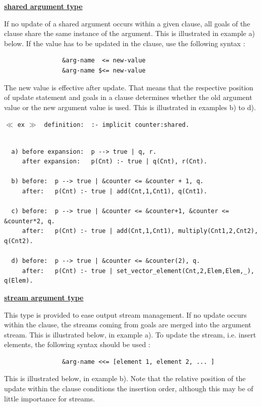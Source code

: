 \noindent\underline{\bf shared argument type}
 \vspace{1ex}\par
If no update of a shared argument occurs within a given clause, all goals
of the clause share the same instance of the argument. This is illustrated in
example a) below. If the value has to be updated in the clause, use the
following syntax :
\begin{verbatim}
                &arg-name  <= new-value
                &arg-name $<= new-value
\end{verbatim} \index{\verb|<=|} \index{\verb|$<=|}
The new value is effective after update. That means that the respective
position of update statement and goals in a clause determines whether the
old argument value or the new argument value is used. This is illustrated
in examples b) to d).\vspace{1ex}

$\ll$ \verb|ex| $\gg$ \verb| definition:  :- implicit counter:shared.|
\begin{verbatim}

  a) before expansion:  p --> true | q, r.
     after expansion:   p(Cnt) :- true | q(Cnt), r(Cnt).

  b) before:  p --> true | &counter <= &counter + 1, q.
     after:   p(Cnt) :- true | add(Cnt,1,Cnt1), q(Cnt1).

  c) before:  p --> true | &counter <= &counter+1, &counter <= &counter*2, q.
     after:   p(Cnt) :- true | add(Cnt,1,Cnt1), multiply(Cnt1,2,Cnt2), q(Cnt2).

  d) before:  p --> true | &counter <= &counter(2), q.
     after:   p(Cnt) :- true | set_vector_element(Cnt,2,Elem,Elem,_), q(Elem).
\end{verbatim}
\vspace{1ex}

\noindent\underline{\bf stream argument type}
 \vspace{1ex}\par
This type is provided to ease output stream management. If no update occurs
within the clause, the streams coming from goals are merged into the argument
stream. This is illustrated below, in example a). To update the stream, i.e.
insert elements, the following syntax should be used :\index{\verb|<<=|}
\begin{verbatim}
                &arg-name <<= [element 1, element 2, ... ]
\end{verbatim}
This is illustrated below, in example b). Note that the relative position
of the update within the clause conditions the insertion order, although this
may be of little importance for streams.\vspace{1ex}

